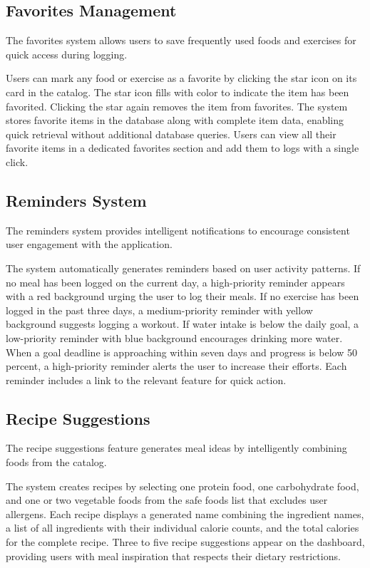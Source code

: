 \subsection{Favorites Management}

The favorites system allows users to save frequently used foods and exercises for quick access during logging.

Users can mark any food or exercise as a favorite by clicking the star icon on its card in the catalog. The star icon fills with color to indicate the item has been favorited. Clicking the star again removes the item from favorites. The system stores favorite items in the database along with complete item data, enabling quick retrieval without additional database queries. Users can view all their favorite items in a dedicated favorites section and add them to logs with a single click.

\subsection{Reminders System}

The reminders system provides intelligent notifications to encourage consistent user engagement with the application.

The system automatically generates reminders based on user activity patterns. If no meal has been logged on the current day, a high-priority reminder appears with a red background urging the user to log their meals. If no exercise has been logged in the past three days, a medium-priority reminder with yellow background suggests logging a workout. If water intake is below the daily goal, a low-priority reminder with blue background encourages drinking more water. When a goal deadline is approaching within seven days and progress is below 50 percent, a high-priority reminder alerts the user to increase their efforts. Each reminder includes a link to the relevant feature for quick action.

\subsection{Recipe Suggestions}

The recipe suggestions feature generates meal ideas by intelligently combining foods from the catalog.

The system creates recipes by selecting one protein food, one carbohydrate food, and one or two vegetable foods from the safe foods list that excludes user allergens. Each recipe displays a generated name combining the ingredient names, a list of all ingredients with their individual calorie counts, and the total calories for the complete recipe. Three to five recipe suggestions appear on the dashboard, providing users with meal inspiration that respects their dietary restrictions.

